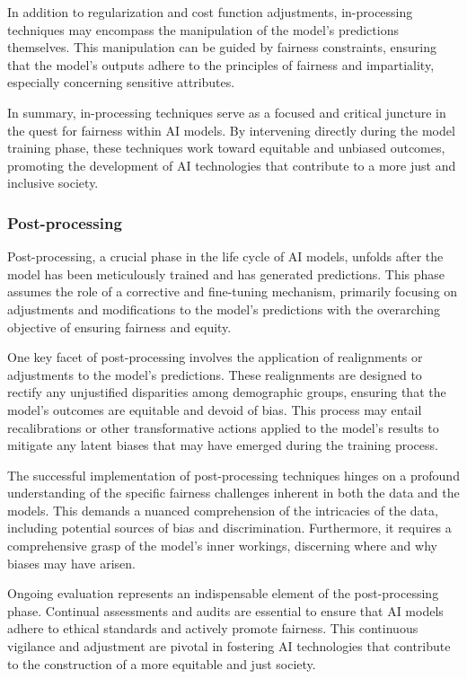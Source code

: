 \documentclass[12pt,a4paper,openright,twoside]{book}
\begin{document}
In addition to regularization and cost function adjustments, in-processing techniques may encompass the manipulation of the model's predictions themselves. This manipulation can be guided by fairness constraints, ensuring that the model's outputs adhere to the principles of fairness and impartiality, especially concerning sensitive attributes. 

In summary, in-processing techniques serve as a focused and critical juncture in the quest for fairness within AI models. By intervening directly during the model training phase, these techniques work toward equitable and unbiased outcomes, promoting the development of AI technologies that contribute to a more just and inclusive society.

\subsubsection{Post-processing}

Post-processing, a crucial phase in the life cycle of AI models, unfolds after the model has been meticulously trained and has generated predictions. This phase assumes the role of a corrective and fine-tuning mechanism, primarily focusing on adjustments and modifications to the model's predictions with the overarching objective of ensuring fairness and equity. 

One key facet of post-processing involves the application of realignments or adjustments to the model's predictions. These realignments are designed to rectify any unjustified disparities among demographic groups, ensuring that the model's outcomes are equitable and devoid of bias. This process may entail recalibrations or other transformative actions applied to the model's results to mitigate any latent biases that may have emerged during the training process. 

The successful implementation of post-processing techniques hinges on a profound understanding of the specific fairness challenges inherent in both the data and the models. This demands a nuanced comprehension of the intricacies of the data, including potential sources of bias and discrimination. Furthermore, it requires a comprehensive grasp of the model's inner workings, discerning where and why biases may have arisen. 

Ongoing evaluation represents an indispensable element of the post-processing phase. Continual assessments and audits are essential to ensure that AI models adhere to ethical standards and actively promote fairness. This continuous vigilance and adjustment are pivotal in fostering AI technologies that contribute to the construction of a more equitable and just society. 
\end{document}
